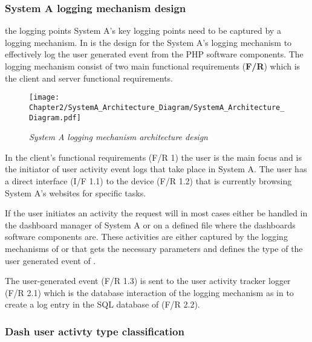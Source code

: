 \subsubsection{System A logging mechanism design}
 the logging points System A's key logging points need to be captured by a logging mechanism. In  is the design for the System A's logging mechanism to effectively log the user generated event from the PHP software components. The logging mechanism consist of two main functional requirements (\textbf{F/R}) which is the client and server functional requirements.

\begin{figure}[!htb] %
	\centering %
	\texttt{[image: Chapter2/SystemA\_Architecture\_Diagram/SystemA\_Architecture\_Diagram.pdf]}
	\caption[System A logging mechanism architecture design]
	{\textit{System A logging mechanism architecture design}}\label{fig:ch2_systemDesign2}
\end{figure}

In the client's functional requirements (F/R 1) the user is the main focus and is the initiator of user activity event logs that take place in System A. The user has a direct interface (I/F 1.1) to the device (F/R 1.2) that is currently browsing System A's websites for specific tasks.\par If the user initiates an activity the request will in most cases either be handled in the dashboard manager of System A or on a defined file where the dashboards software components are. These activities are either captured by the logging mechanisms of  or  that gets the necessary parameters and defines the type of the user generated event of . \par The user-generated event (F/R 1.3) is sent to the user activity tracker logger (F/R 2.1) which is the database interaction of the logging mechanism as in  to create a log entry in the SQL database of (F/R 2.2).

\subsubsection{Dash user activty type classification}

